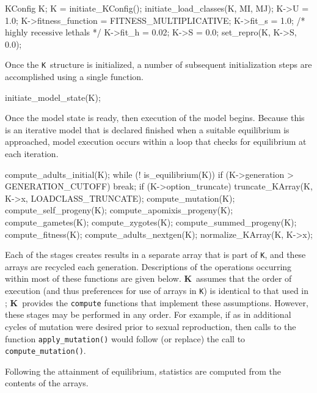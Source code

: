 \documentclass[12pt,twoside,letterpaper,fleqn]{report}
\numberwithin{equation}{section}  %
\newcommand{\K}{{\bf K}}
\newcommand{\KK}{\mbox{{\tt K}}}  %
\begin{document}
\begin{C}[gobble=4]
    KConfig K;
    K = initiate_KConfig();
    initiate_load_classes(K, MI, MJ);
    K->U = 1.0;
    K->fitness_function = FITNESS_MULTIPLICATIVE;
    K->fit_s = 1.0;  /* highly recessive lethals */
    K->fit_h = 0.02;
    K->S = 0.0;
    set_repro(K, K->S, 0.0);
\end{C}

Once the \KK\ structure is initialized, a number of subsequent initialization
steps are accomplished using a single function.

\begin{C}[gobble=4]
    initiate_model_state(K);
\end{C}

Once the model state is ready, then execution of the model begins.  Because
this is an iterative model that is declared finished when a suitable
equilibrium is approached, model execution occurs within a loop that checks for
equilibrium at each iteration.

\begin{C}[gobble=4]
    compute_adults_initial(K);
    while (! is_equilibrium(K)) {
        if (K->generation > GENERATION_CUTOFF)
            break;
        if (K->option_truncate)
            truncate_KArray(K, K->x, LOADCLASS_TRUNCATE);
        compute_mutation(K);
        compute_self_progeny(K);
        compute_apomixis_progeny(K);
        compute_gametes(K);
        compute_zygotes(K);
        compute_summed_progeny(K);
        compute_fitness(K);
        compute_adults_nextgen(K);
        normalize_KArray(K, K->x);
    }
\end{C}

Each of the stages creates results in a separate array that is part of \KK, and
these arrays are recycled each generation.  Descriptions of the operations
occurring within most of these functions are given below.  \K\ assumes that the
order of execution (and thus preferences for use of arrays in \KK) is identical
to that used in \citet{Charlesworth:1990:5337}; \K\ provides the
\lstinline{compute} functions that implement these assumptions.  However, these
stages may be performed in any order.  For example, if as in
\citet{Muirhead:1997:5426} additional cycles of mutation were desired prior to
sexual reproduction, then calls to the function \lstinline{apply_mutation()}
would follow (or replace) the call to \lstinline{compute_mutation()}.

Following the attainment of equilibrium, statistics are computed from the
contents of the arrays. 
\end{document}
